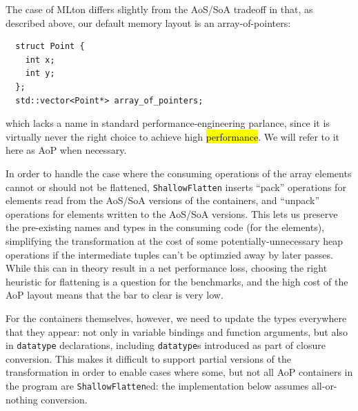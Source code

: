 \documentclass[leqno,11pt]{article}
\begin{document}
The case of MLton differs slightly from the AoS/SoA tradeoff in that, as
described above, our default memory layout is an array-of-pointers:
\begin{verbatim}
  struct Point {
    int x;
    int y;
  };
  std::vector<Point*> array_of_pointers;
\end{verbatim}
which lacks a name in standard performance-engineering parlance, since it is
virtually never the right choice to achieve high \hl{performance}. We will refer
to it here as AoP when necessary.

In order to handle the case where the consuming operations of the array elements
cannot or should not be flattened, \texttt{ShallowFlatten} inserts ``pack''
operations for elements read from the AoS/SoA versions of the containers, and
``unpack'' operations for elements written to the AoS/SoA versions. This lets us
preserve the pre-existing names and types in the consuming code (for the
elements), simplifying the transformation at the cost of some
potentially-unnecessary heap operations if the intermediate tuples can't be
optimzied away by later passes. While this can in theory result in a net
performance loss, choosing the right heuristic for flattening is a question for
the benchmarks, and the high cost of the AoP layout means that the bar to clear
is very low.

For the containers themselves, however, we need to update the types everywhere
that they appear: not only in variable bindings and function arguments, but also
in \texttt{datatype} declarations, including \texttt{datatype}s introduced as
part of closure conversion. This makes it difficult to support partial versions
of the transformation in order to enable cases where some, but not all AoP
containers in the program are \texttt{ShallowFlatten}ed: the implementation
below assumes all-or-nothing conversion.



\end{document}
